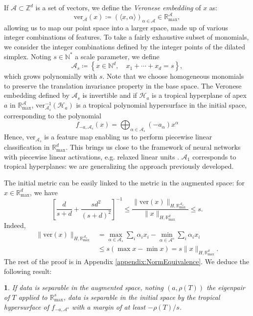 \documentclass[oneside,UKenglish,a4paper]{amsart}
\numberwithin{equation}{section}
\numberwithin{figure}{section}
\theoremstyle{plain}
\theoremstyle{definition}
\theoremstyle{plain}
\newtheorem{prop}[thm]{\protect\propositionname}
\theoremstyle{remark}
\theoremstyle{plain}
\theoremstyle{definition}
\theoremstyle{definition}
\providecommand{\propositionname}{Proposition}
\begin{document}
If $\mathcal{A}\subset\mathbb{Z}^{d}$ is a set of vectors, we define
the \emph{Veronese embedding} of $x$ as:
\[
\text{ver}_{\mathcal{A}}(x)\coloneqq\left(\langle x,\alpha\rangle\right)_{\alpha\in\mathcal{A}}\in\mathbb{R}_{\max}^{\mathcal{A}},
\]
allowing us to map our point space into a larger space, made up of
various integer combinations of features. To take a fairly exhaustive
subset of monomials, we consider the integer combinations defined
by the integer points of the dilated simplex. Noting $s\in\mathbb{N}^{*}$
a scale parameter, we define
\[
\mathcal{A}_{s}\coloneqq\left\{x\in\mathbb{N}^{d},\quad x_{1}+\cdots+x_{d}=s\right\},
\]
which grows polynomially with $s$. Note that we choose homogeneous monomials to preserve the translation invariance property in the base space. The Veronese embedding defined
by $\mathcal{A}_{s}$ is invertible and if $\mathcal{H}_a$ is a tropical
hyperplane of apex $a$ in $\mathbb{R}_{\max}^{\mathcal{A}}$, $\text{ver}_{\mathcal{A}_{s}}^{-1}(\mathcal{H}_a)$
is a tropical polynomial hypersurface in the initial space, corresponding to the polynomial
\[ f_{-a, \mathcal{A}_s}(x)=\bigoplus_{\alpha\in \mathcal{A}_s} (-a_\alpha)x^\alpha \]
Hence, $\text{ver}_{\mathcal{A}_{s}}$ is a feature map
enabling us to perform piecewise linear classification in $\mathbb{R}_{\max}^{d}$. This brings us close to the framework of neural networks with piecewise linear activations, e.g. relaxed linear units \cite{zhang2018tropical}. $\mathcal{A}_1$ corresponds to tropical hyperplanes: we are generalizing the approach previously developed.

The initial metric can be easily linked to the metric in the augmented space: for $x\in\mathbb{R}_{\max}^d$, we have
\[
\left[\frac{d}{s+d}+\frac{sd^{2}}{(s+d)^{2}}\right]^{-1} \le \frac{\lVert\text{ver}(x)\rVert_{H,\mathbb{R}^{\mathcal{A}_s}_{\max}}}{\lVert x\rVert_{H,\mathbb{R}_{\max}^d}} \le s.
\]
Indeed,
\begin{align*}
\lVert\text{ver}(x)\rVert_{H,\mathbb{R}^{\mathcal{A}_s}_{\max}}&=\max_{\alpha\in\mathcal{A}_{s}}\sum_{i}\alpha_{i}x_{i}-\min_{\alpha\in\mathcal{A}^{s}}\sum_{i}\alpha_{i}x_{i}\\&\le s(\max x-\min x)=s\lVert x\rVert_{H,\mathbb{R}_{\max}^d}.
\end{align*}
The rest of the proof is in Appendix \ref{appendix:NormEquivalence}. We deduce the following result:
\begin{prop}
If data is separable in the augmented space, noting $(a, \rho(T))$ the eigenpair of $T$ applied to $\mathbb{R}_{\max}^s$, data is separable in the initial space by the tropical hypersurface of $f_{-a,\mathcal{A}^s}$ with a margin of at least $-\rho(T)/s$.
\end{prop}
\end{document}
